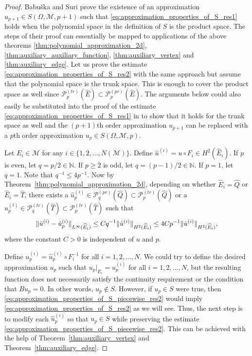 \documentclass[english, 12pt, a4paper, sci, utf8, a-2b, online]{aaltothesis}
\theoremstyle{definition}
\theoremstyle{plain}
\DeclarePairedDelimiter\norm{\lVert}{\rVert}
\numberwithin{equation}{section}
\begin{document}
\begin{proof}
    Babu{\v s}ka and Suri \cite[Theorem~4.1]{babuskasuri1987} prove the existence of an
    approximation $u_{p+1} \in S(\Omega, \mathcal{M}, p+1)$ such that 
    \eqref{eq:approximation_properties_of_S_res1} holds when the polynomial space in the
    definition of $S$ is the product space. The steps of their proof
    can essentially be mapped to applications of the above theorems
    \ref{thm:polynomial_approximation_2d}, \ref{thm:auxiliary_auxiliary_function},
    \ref{thm:auxiliary_vertex} and \ref{thm:auxiliary_edge}.
    Let us prove the estimate \eqref{eq:approximation_properties_of_S_res2}
    with the same approach but assume that the polynomial space is the trunk space.
    This is enough to cover the product space as well since
    $\mathcal{P}_p^{(tr)}(\widehat{E}) \subset \mathcal{P}_p^{(pr)}(\widehat{E})$.
    The arguments below could also easily be substituted into the proof of the estimate
    \eqref{eq:approximation_properties_of_S_res1} in \cite{babuskasuri1987}
    to show that it holds for the trunk space as well and the $(p+1)$th order approximation
    $u_{p+1}$ can be replaced with a $p$th order approximation $u_p \in S(\Omega, \mathcal{M}, p)$.

    Let $E_i \in \mathcal{M}$ for any $i \in \{ 1,2,\dotsc,N(\mathcal{M}) \}$.
    Define $\hat{u}^{(i)} = u \circ F_i \in H^2(\widehat{E}_i)$.
    If $p$ is even, let $q = p/2 \in \mathbb{N}$.
    If $p \geq 2$ is odd, let $q = (p-1)/2 \in \mathbb{N}$.
    If $p=1$, let $q=1$. Note that $q^{-1} \leq 4 p^{-1}$.
    Now by Theorem~\ref{thm:polynomial_approximation_2d},
    depending on whether $\widehat{E}_i = \widehat{Q}$ or $\widehat{E}_i = \widehat{T}$,
    there exists a $\hat{u}_p^{(i)} \in \mathcal{P}_q^{(pr)}(\widehat{Q})
    \subset \mathcal{P}_p^{(tr)}(\widehat{Q})$ or a
    $\hat{u}_p^{(i)} \in \mathcal{P}_q^{(tr)}(\widehat{T})
    \subset \mathcal{P}_p^{(tr)}(\widehat{T})$ such that
    \begin{equation}
        \label{eq:approximation_properties_of_S_piecewise_res2}
        \norm{\hat{u}^{(i)}-\hat{u}_p^{(i)}}_{L^{\infty}(\widehat{E}_i)}
        \leq C q^{-1} \norm{\hat{u}^{(i)}}_{H^2(\widehat{E}_i)}
        \leq 4 C p^{-1} \norm{\hat{u}^{(i)}}_{H^2(\widehat{E}_i)},
    \end{equation}
    where the constant $C > 0$ is independent of $u$ and $p$.

    Define $u_p^{(i)} = \hat{u}_p^{(i)} \circ F_i^{-1}$ for all $i=1,2,\dotsc,N$.
    We could try to define the desired approximation $u_p$ such that
    $u_p|_{E_i} = u_p^{(i)}$ for all $i=1,2,\dotsc,N$, but the resulting function
    does not necessarily satisfy the continuity requirement or the condition that $Bu_p = 0$.
    In other words, $u_p \notin S$. However, if $u_p \in S$ were true, then
    \eqref{eq:approximation_properties_of_S_piecewise_res2} would imply
    \eqref{eq:approximation_properties_of_S_res2} as we will see.
    Thus, the next step is to modify each $\hat{u}_p^{(i)}$ so that $u_p \in S$
    while preserving the estimate \eqref{eq:approximation_properties_of_S_piecewise_res2}.
    This can be achieved with the help of Theorem~\ref{thm:auxiliary_vertex}
    and Theorem~\ref{thm:auxiliary_edge}.


\end{proof}
\end{document}
